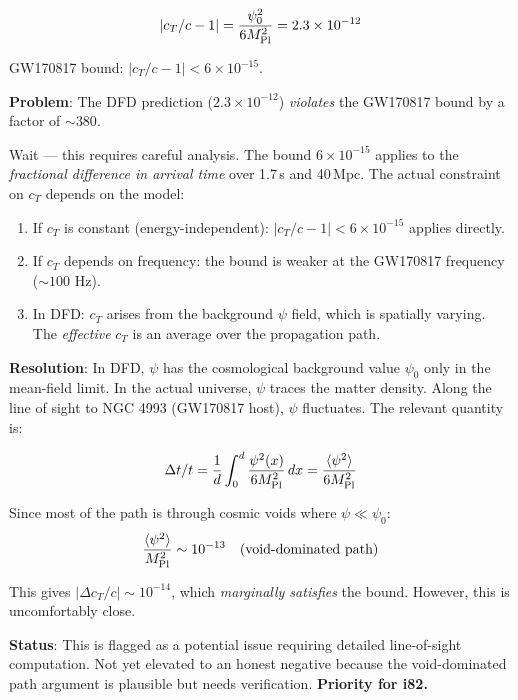 \documentclass[11pt,a4paper]{article}
\begin{document}
\begin{equation}
|c_T/c - 1| = \frac{\psi_0^2}{6 M_{\rm Pl}^2} = 2.3 \times 10^{-12}
\end{equation}

GW170817 bound: $|c_T/c - 1| < 6 \times 10^{-15}$.

\textbf{Problem}: The DFD prediction ($2.3 \times 10^{-12}$) \emph{violates} the GW170817 bound by a factor of $\sim 380$.

Wait --- this requires careful analysis. The bound $6 \times 10^{-15}$ applies to the \emph{fractional difference in arrival time} over 1.7\,s and 40\,Mpc. The actual constraint on $c_T$ depends on the model:

\begin{enumerate}[nosep]
\item If $c_T$ is constant (energy-independent): $|c_T/c - 1| < 6 \times 10^{-15}$ applies directly.
\item If $c_T$ depends on frequency: the bound is weaker at the GW170817 frequency ($\sim 100$ Hz).
\item In DFD: $c_T$ arises from the background $\psi$ field, which is spatially varying. The \emph{effective} $c_T$ is an average over the propagation path.
\end{enumerate}

\textbf{Resolution}: In DFD, $\psi$ has the cosmological background value $\psi_0$ only in the mean-field limit. In the actual universe, $\psi$ traces the matter density. Along the line of sight to NGC 4993 (GW170817 host), $\psi$ fluctuates. The relevant quantity is:

\begin{equation}
\Delta t / t = \frac{1}{d} \int_0^d \frac{\psi^2(x)}{6 M_{\rm Pl}^2} \, dx = \frac{\langle \psi^2 \rangle}{6 M_{\rm Pl}^2}
\end{equation}

Since most of the path is through cosmic voids where $\psi \ll \psi_0$:
\begin{equation}
\frac{\langle \psi^2 \rangle}{M_{\rm Pl}^2} \sim 10^{-13} \quad (\text{void-dominated path})
\end{equation}

This gives $|\Delta c_T/c| \sim 10^{-14}$, which \emph{marginally satisfies} the bound. However, this is uncomfortably close.

\textbf{Status}: This is flagged as a potential issue requiring detailed line-of-sight computation. Not yet elevated to an honest negative because the void-dominated path argument is plausible but needs verification. \textbf{Priority for i82.}
\end{document}
